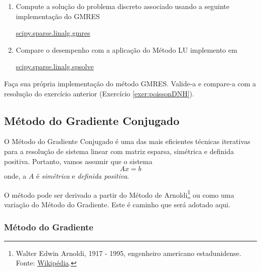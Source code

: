 \begin{exer}
  \begin{enumerate}
  \item Compute a solução do problema discreto associado usando a seguinte implementação {\python} do GMRES
    \begin{center}
      \href{https://docs.scipy.org/doc/scipy/reference/generated/scipy.sparse.linalg.gmres.html}{scipy.sparse.linalg.gmres}
    \end{center}
  \item Compare o desempenho com a aplicação do Método LU implemento em
    \begin{center}
      \href{https://docs.scipy.org/doc/scipy/reference/generated/scipy.sparse.linalg.spsolve.html}{scipy.sparse.linalg.spsolve}
    \end{center}
  \end{enumerate}
\end{exer}

\begin{exer}
  Faça sua própria implementação do método GMRES. Valide-a e compare-a com a resolução do exercício anterior (Exercício \ref{exer:poissonDNH}).
\end{exer}

\subsection{Método do Gradiente Conjugado}

O Método do Gradiente Conjugado é uma das mais eficientes técnicas iterativas para a resolução de sistema linear com matriz esparsa, simétrica e definida positiva. Portanto, vamos assumir que o sistema
\begin{equation}
  Ax = b
\end{equation}
onde, a $A$ é \emph{simétrica} e \emph{definida positiva}.

O método pode ser derivado a partir do Método de Arnoldi\footnote{Walter Edwin Arnoldi, 1917 - 1995, engenheiro americano estadunidense. Fonte: \href{https://pt.wikipedia.org/wiki/Walter_Edwin_Arnoldi}{Wikipédia}.} \cite[Seção 6.7]{Saad2003} ou como uma variação do Método do Gradiente. Este é caminho que será adotado aqui.

\subsubsection{Método do Gradiente}

